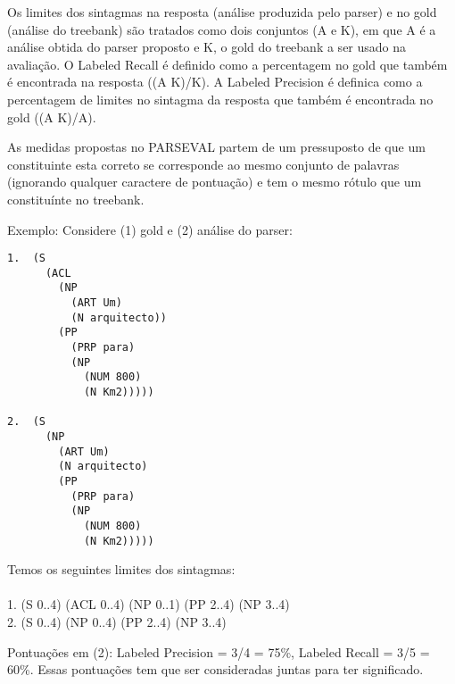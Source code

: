 Os limites dos sintagmas na resposta (análise produzida pelo parser) e no gold (análise do treebank) são tratados como dois conjuntos (A e K), em que A é a análise obtida do parser proposto e K, o gold do treebank a ser usado na avaliação. O Labeled Recall
é definido como a percentagem no gold que também é encontrada na resposta ((A K)/K). A Labeled Precision é definica como a percentagem de limites no sintagma da resposta que também é encontrada no gold ((A K)/A).

As medidas propostas no PARSEVAL partem de um pressuposto de que um constituinte esta correto se corresponde ao mesmo conjunto de palavras (ignorando qualquer caractere de pontuação) e tem o mesmo rótulo que um constituínte no treebank.

Exemplo: Considere (1) gold e (2) análise do parser:

\begin{center}
\footnotesize
\begin{verbatim}
1.  (S
      (ACL
        (NP
          (ART Um)
          (N arquitecto))
        (PP
          (PRP para)
          (NP
            (NUM 800)
            (N Km2)))))

2.  (S
      (NP
        (ART Um)
        (N arquitecto)
        (PP
          (PRP para)
          (NP
            (NUM 800)
            (N Km2)))))
\end{verbatim}
\end{center}

Temos os seguintes limites dos sintagmas:\\ \\
1. (S 0..4) (ACL 0..4) (NP 0..1) (PP 2..4) (NP 3..4)\\
2. (S 0..4) (NP 0..4) (PP 2..4) (NP 3..4)

Pontuações em (2): Labeled Precision = 3/4 = 75{\%}, Labeled Recall = 3/5 = 60{\%}. Essas pontuações tem que ser consideradas juntas para ter significado. 

